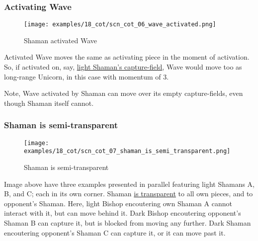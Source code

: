 \clearpage %

\subsubsection*{Activating Wave}
\label{sec:Conquest of Tlalocan/Shaman/Movement/Activating Wave}

\vspace*{-1.4\baselineskip}
\noindent
\begin{figure}[!h]
\texttt{[image: examples/18\_cot/scn\_cot\_06\_wave\_activated.png]}
\caption{Shaman activated Wave}
\label{fig:scn_cot_06_wave_activated}
\end{figure}

Activated Wave moves the same as activating piece in the moment of activation.
So, if activated on, say,
\hyperref[fig:scn_cot_03_light_shaman_capture_ply]{light Shaman's capture-field},
Wave would move too as long-range Unicorn, in this case with momentum of 3.

Note, Wave activated by Shaman can move over its empty capture-fields, even though
Shaman itself cannot.

\clearpage %

\subsubsection*{Shaman is semi-transparent}
\label{sec:Conquest of Tlalocan/Shaman/Movement/Shaman is semi-transparent}

\vspace*{-1.5\baselineskip}
\noindent
\begin{figure}[!h]
\texttt{[image: examples/18\_cot/scn\_cot\_07\_shaman\_is\_semi\_transparent.png]}
\vspace*{-1.4\baselineskip}
\caption{Shaman is semi-transparent}
\label{fig:scn_cot_07_shaman_is_semi_transparent}
\end{figure}

\vspace*{-0.5\baselineskip}
Image above have three examples presented in parallel featuring light Shamans A, B,
and C; each in its own corner. \newline
\indent
Shaman \hyperref[fig:scn_mv_07_wave_is_transparent]{is transparent} to all own pieces,
and to opponent's Shaman. Here, light Bishop encoutering own Shaman A cannot interact
with it, but can move behind it. Dark Bishop encoutering opponent's Shaman B can
capture it, but is blocked from moving any further. Dark Shaman encoutering opponent's
Shaman C can capture it, or it can move past it.

